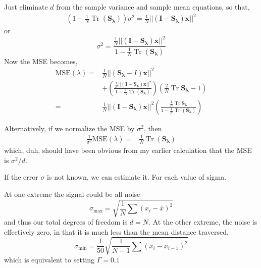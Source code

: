 \documentclass[11pt]{article}
\DeclareMathOperator{\Tr}{Tr}
\begin{document}
Just eliminate $d$ from the sample variance and sample mean equations, so that,
\begin{align}
    \left( 1 - \frac{1}{N} \Tr \left( \mathbf{S_\lambda} \right) \right) \sigma^2 =  \frac{1}{N} || \left( \mathbf{I} - \mathbf{S_\lambda} \right) \mathbf{x} ||^2
\end{align}
or
\begin{equation}
    \sigma^2 = \frac{ \frac{1}{N}|| \left( \mathbf{I} - \mathbf{S_\lambda} \right) \mathbf{x} ||^2}{1-\frac{1}{N}\Tr \left( \mathbf{S_\lambda} \right)}
\end{equation}
Now the MSE becomes,
\begin{align}
\nonumber
    \textrm{MSE}(\lambda) =& \frac{1}{N} || \left( \mathbf{S_\lambda} - I \right) \mathbf{x} ||^2 \\
    & + \left( \frac{\frac{1}{N}|| \left( \mathbf{I} - \mathbf{S_\lambda} \right) \mathbf{x} ||^2}{1-\frac{1}{N}\Tr \left( \mathbf{S_\lambda} \right)} \right) \left( \frac{2}{N} \Tr \mathbf{S_\lambda} -1 \right) \\
    =& \frac{1}{N}|| \left( \mathbf{I} - \mathbf{S_\lambda} \right) \mathbf{x} ||^2 \left( \frac{ \frac{1}{N} \Tr \mathbf{S_\lambda}}{1-\frac{1}{N}\Tr \left( \mathbf{S_\lambda} \right)} \right)
\end{align}

Alternatively, if we normalize the MSE by $\sigma^2$, then
\begin{align}
   \frac{1}{\sigma^2} \textrm{MSE}(\lambda) =& \frac{1}{N}\Tr \left( \mathbf{S_\lambda} \right)
\end{align}
which, duh, should have been obvious from my earlier calculation that the MSE is $\sigma^2/d$.

If the error $\sigma$ is not known, we can estimate it. For each value of sigma.

At one extreme the signal could be all noise
\begin{equation}
    \sigma_{\textrm{max}} = \sqrt{\frac{1}{N} \sum (x_i-\bar{x})^2}
\end{equation}
and thus our total degrees of freedom is $d=N$. At the other extreme, the noise is effectively zero, in that it is much less than the mean distance traversed,
\begin{equation}
    \sigma_{\textrm{min}} = \frac{1}{50} \sqrt{\frac{1}{N-1} \sum (x_i-x_{i-1})^2}
\end{equation}
which is equivalent to setting $\Gamma = 0.1$
\end{document}
